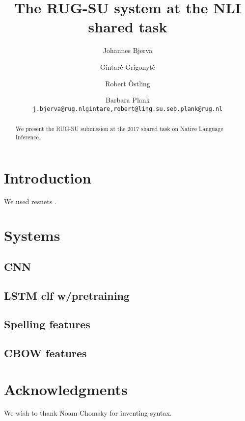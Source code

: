 \documentclass[11pt,letterpaper]{article}
\title{The RUG-SU system at the NLI shared task}
\author{Johannes Bjerva \and Gintar\.e Grigonyt\.e \and Robert {\"O}stling \and Barbara Plank \\
{\tt j.bjerva@rug.nl\hfill{gintare,robert}@ling.su.se\hfill b.plank@rug.nl}}
\date{}
\begin{document}
\maketitle

\begin{abstract}
    We present the RUG-SU submission at the 2017 shared task on Native
    Language Inference.
\end{abstract}


\section{Introduction}

We used resnets \citep{He2016identity}.

\section{Systems}

\subsection{CNN}

\subsection{LSTM clf w/pretraining}


\subsection{Spelling features}

\subsection{CBOW features}

\section*{Acknowledgments}

We wish to thank Noam Chomsky for inventing syntax.



\end{document}
